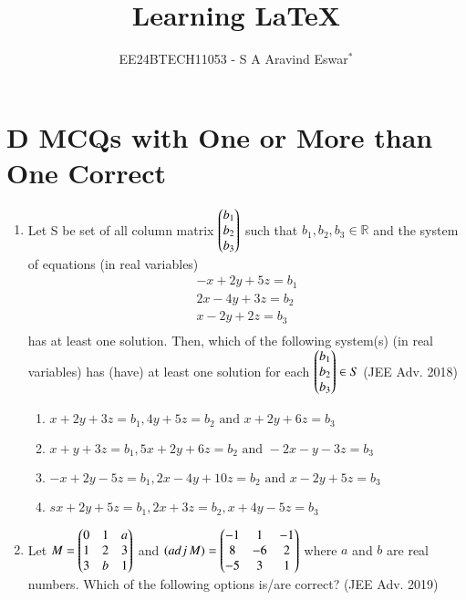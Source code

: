 \documentclass[journal,12pt,twocolumn]{IEEEtran}
\theoremstyle{remark}
\begin{document}

\vspace{3cm}

\title{Learning {\LaTeX}}
\author{EE24BTECH11053 - S A Aravind Eswar$^{*}$}
\maketitle
\newpage
\bigskip

\renewcommand{\thefigure}{\theenumi}
\renewcommand{\thetable}{\theenumi}
\section{D MCQs with One or More than One Correct}
\begin{enumerate}
\item Let S be set of all column matrix $\begin{pmatrix}b_1\\b_2\\b_3\end{pmatrix}$ such that $b_1, b_2, b_3 \in \mathbb{R}$ and the system of equations (in real variables)\\ \begin{align*}-x+2y+5z=b_1\\2x-4y+3z=b_2\\x-2y+2z=b_3\\ \end{align*} has at least one solution. Then, which of the following system(s) (in real variables) has (have) at least one solution for each $\begin{pmatrix}b_1\\b_2\\b_3\end{pmatrix}\in S$ \hfill(JEE Adv. 2018)

\begin{enumerate}
    \item $x+2y+3z=b_1, 4y+5z=b_2 \text{ and }x+2y+6z=b_3$
    \item $x+y+3z=b_1, 5x+2y+6z=b_2\text{ and }-2x-y-3z=b_3$
    \item $-x+2y-5z=b_1,2x-4y+10z=b_2\text{ and }x-2y+5z=b_3$
    \item $sx+2y+5z=b_1,2x+3z=b_2,x+4y-5z=b_3$\\[2pt]
\end{enumerate}

\item Let $M=\begin{pmatrix}
    0 & 1 & a\\
    1 & 2 & 3\\
    3 & b & 1
\end{pmatrix}$ and $(\mathop{adj}M)=\begin{pmatrix}
    -1 & 1 & -1\\
    8 & -6 & 2\\
    -5 & 3 & 1
\end{pmatrix}$ where $a$ and $b$ are real numbers. Which of the following options is/are correct? \hfill (JEE Adv. 2019)


\end{enumerate}
\end{document}
